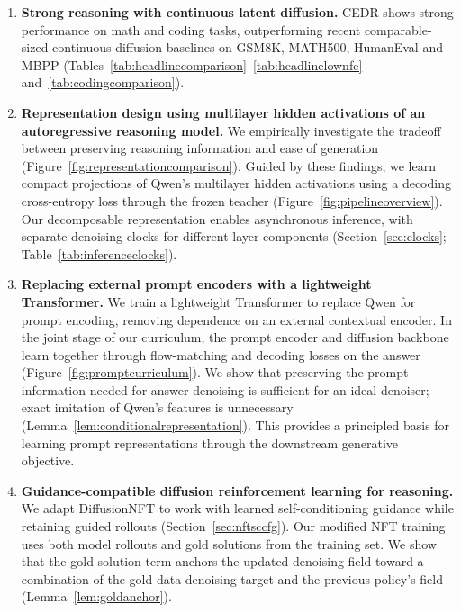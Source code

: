 \documentclass[11pt,letterpaper]{article}
\begin{document}
\begin{enumerate}
    \item \textbf{Strong reasoning with continuous latent diffusion.}
    CEDR shows strong performance on math and coding tasks, outperforming recent comparable-sized continuous-diffusion baselines on GSM8K, MATH500, HumanEval and MBPP (Tables~\ref{tab:headlinecomparison}--\ref{tab:headlinelownfe} and~\ref{tab:codingcomparison}).

    \item \textbf{Representation design using multilayer hidden activations of an autoregressive reasoning model.}
    We empirically investigate the tradeoff between preserving reasoning information and ease of generation (Figure~\ref{fig:representationcomparison}). Guided by these findings, we learn compact projections of Qwen's multilayer hidden activations using a decoding cross-entropy loss through the frozen teacher (Figure~\ref{fig:pipelineoverview}). Our decomposable representation enables asynchronous inference, with separate denoising clocks for different layer components (Section~\ref{sec:clocks}; Table~\ref{tab:inferenceclocks}).

    \item \textbf{Replacing external prompt encoders with a lightweight Transformer.}
    We train a lightweight Transformer to replace Qwen for prompt encoding, removing dependence on an external contextual encoder. In the joint stage of our curriculum, the prompt encoder and diffusion backbone learn together through flow-matching and decoding losses on the answer (Figure~\ref{fig:promptcurriculum}). We show that preserving the prompt information needed for answer denoising is sufficient for an ideal denoiser; exact imitation of Qwen's features is unnecessary (Lemma~\ref{lem:conditionalrepresentation}). This provides a principled basis for learning prompt representations through the downstream generative objective.

    \item \textbf{Guidance-compatible diffusion reinforcement learning for reasoning.}
    We adapt DiffusionNFT \citep{diffusionnft} to work with learned self-conditioning guidance while retaining guided rollouts (Section~\ref{sec:nftsccfg}). Our modified NFT training uses both model rollouts and gold solutions from the training set. We show that the gold-solution term anchors the updated denoising field toward a combination of the gold-data denoising target and the previous policy's field (Lemma~\ref{lem:goldanchor}).
\end{enumerate}
\end{document}

